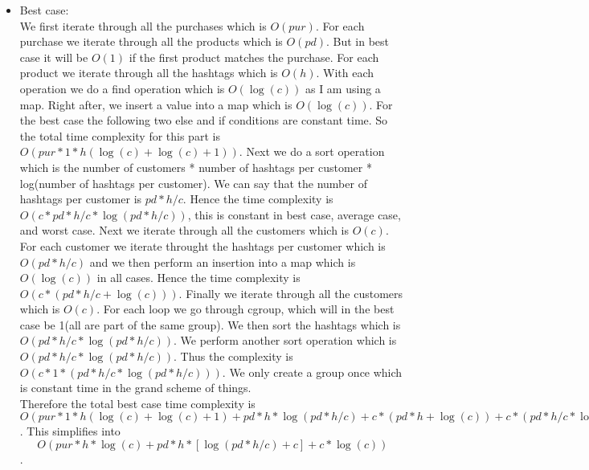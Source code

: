 \documentclass[12pt]{article}
\begin{document}
\begin{itemize}
    \item Best case: \\ We first iterate through all the purchases which is $O(pur)$. For each purchase we iterate through all the products which is $O(pd)$. But in best case it will be $O(1)$ if the first product matches the purchase. For each product we iterate through all the hashtags which is $O(h)$. With each operation we do a find operation which is $O(\log(c))$ as I am using a map. Right after, we insert a value into a map which is $O(\log(c))$. For the best case the following two else and if conditions are constant time. So the total time complexity for this part is $O(pur*1*h(\log(c) + \log(c) + 1))$. Next we do a sort operation which is the number of customers * number of hashtags per customer * log(number of hashtags per customer). We can say that the number of hashtags per customer is $pd * h / c$. Hence the time complexity is $O(c*pd*h/c * \log(pd*h/c))$, this is constant in best case, average case, and worst case. Next we iterate through all the customers which is $O(c)$. For each customer we iterate throught the hashtags per customer which is $O(pd*h/c)$ and we then perform an insertion into a map which is $O(\log(c))$ in all cases. Hence the time complexity is $O(c*(pd*h/c + \log(c)))$. Finally we iterate through all the customers which is $O(c)$. For each loop we go through cgroup, which will in the best case be 1(all are part of the same group). We then sort the hashtags which is $O(pd*h/c*\log(pd*h/c))$. We perform another sort operation which is $O(pd*h/c*\log(pd*h/c))$. Thus the complexity is $O(c*1*(pd*h/c * \log(pd*h/c)))$. We only create a group once which is constant time in the grand scheme of things.\\
    Therefore the total best case time complexity is $O(pur*1*h(\log(c) + \log(c) + 1) + pd*h*\log(pd*h/c) + c*(pd*h + \log(c)) + c*(pd*h/c * \log(pd*h/c)))$. This simplifies into $$O(pur*h*\log(c) + pd*h*[\log(pd*h/c) + c] + c*\log(c))$$.

\end{itemize}
\end{document}
